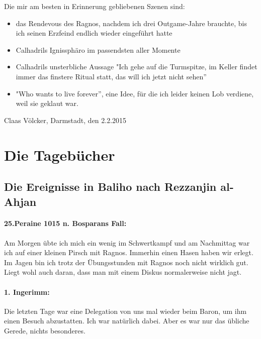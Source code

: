 Die mir am besten in Erinnerung gebliebenen Szenen sind:
\begin{itemize}
\item das Rendevous des Ragnos, nachdem ich drei Outgame-Jahre brauchte, bis ich seinen Erzfeind endlich wieder eingeführt hatte
\item Calhadrils Ignissphäro im passendsten aller Momente
\item Calhadrils unsterbliche Aussage "Ich gehe auf die Turmspitze, im Keller findet immer das finstere Ritual statt, das will ich jetzt nicht sehen''
\item "Who wants to live forever'', eine Idee, für die ich leider keinen Lob verdiene, weil sie geklaut war.
\end{itemize}


\begin{flushright}
Claas Völcker, Darmstadt, den 2.2.2015
\end{flushright}


\section{Die Tagebücher}


\subsection{Die Ereignisse in Baliho nach Rezzanjin al-Ahjan}

\paragraph{25.Peraine 1015 n. Bosparans Fall:} Am Morgen übte ich mich ein wenig im Schwertkampf und am Nachmittag war ich auf einer kleinen Pirsch mit Ragnos. Immerhin einen Hasen haben wir erlegt. Im Jagen bin ich trotz der Übungsstunden mit Ragnos noch nicht wirklich gut. Liegt wohl auch daran, dass man mit einem Diskus normalerweise nicht jagt.

\paragraph{1. Ingerimm:} Die letzten Tage war eine Delegation von uns mal wieder beim Baron, um ihm einen Besuch abzustatten. Ich war natürlich dabei. Aber es war nur das übliche Gerede, nichts besonderes.

